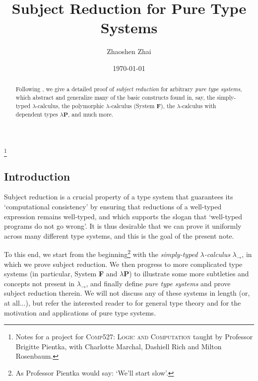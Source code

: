 \documentclass[reqno]{amsart}
\begin{document}
    \title{Subject Reduction for Pure Type Systems}
    \author{Zhaoshen Zhai}
    \address{Department of Mathematics and Statistics, McGill University, 805 Sherbrooke Street West, Montreal, QC, H3A 0B9, Canada}
    \date{\today}
    \thanks{Notes for a project for \textsc{Comp527: Logic and Computation} taught by Professor Brigitte Pientka, with Charlotte Marchal, Dashiell Rich and Milton Rosenbaum.}

    \begin{abstract}
        Following \cite{SU06}, we give a detailed proof of \textit{subject reduction} for arbitrary \textit{pure type systems}, which abstract and generalize many of the basic constructs found in, say, the simply-typed $\lambda$-calculus, the polymorphic $\lambda$-calculus (System \textbf{F}), the $\lambda$-calculus with dependent types $\lambda\mathbf{P}$, and much more.
    \end{abstract}

    \maketitle

    \subsection*{Introduction}

    Subject reduction is a crucial property of a type system that guarantees its `computational consistency' by ensuring that reductions of a well-typed expression remains well-typed, and which supports the slogan that `well-typed programs do not go wrong'. It is thus desirable that we can prove it uniformly across many different type systems, and this is the goal of the present note.

    To this end, we start from the beginning\footnote{As Professor Pientka would say: `We'll start slow'.} with the \textit{simply-typed $\lambda$-calculus} $\lambda_\rightarrow$, in which we prove subject reduction. We then progress to more complicated type systems (in particular, System \textbf{F} and $\lambda\mathbf{P}$) to illustrate some more subtleties and concepts not present in $\lambda_\rightarrow$, and finally define \textit{pure type systems} and prove subject reduction therein. We will not discuss any of these systems in length (or, at all...), but refer the interested reader to \cite{SU06} for general type theory and \cite{Bar91} for the motivation and applications of pure type systems.
\end{document}
